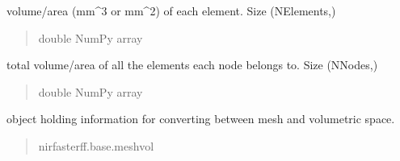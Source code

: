 \documentclass[letterpaper,10pt,english]{sphinxmanual}
\begin{document}
\begin{fulllineitems}
\begin{fulllineitems}
\begin{quote}
\begin{description}
\end{description}\end{quote}

\end{fulllineitems}


\begin{fulllineitems}
\label{\detokenize{_autosummary/nirfasterff.base.dcs_mesh.dcsmesh:nirfasterff.base.dcs_mesh.dcsmesh.element_area}}
\pysigstartsignatures
\pysigline
{}
\pysigstopsignatures
\sphinxAtStartPar
volume/area (mm\textasciicircum{}3 or mm\textasciicircum{}2) of each element. Size (NElements,)
\begin{quote}\begin{description}
\sphinxAtStartPar
double NumPy array

\end{description}\end{quote}

\end{fulllineitems}


\begin{fulllineitems}
\label{\detokenize{_autosummary/nirfasterff.base.dcs_mesh.dcsmesh:nirfasterff.base.dcs_mesh.dcsmesh.support}}
\pysigstartsignatures
\pysigline
{}
\pysigstopsignatures
\sphinxAtStartPar
total volume/area of all the elements each node belongs to. Size (NNodes,)
\begin{quote}\begin{description}
\sphinxAtStartPar
double NumPy array

\end{description}\end{quote}

\end{fulllineitems}


\begin{fulllineitems}
\label{\detokenize{_autosummary/nirfasterff.base.dcs_mesh.dcsmesh:nirfasterff.base.dcs_mesh.dcsmesh.vol}}
\pysigstartsignatures
\pysigline
{}
\pysigstopsignatures
\sphinxAtStartPar
object holding information for converting between mesh and volumetric space.
\begin{quote}\begin{description}
\sphinxAtStartPar
nirfasterff.base.meshvol


\end{description}
\end{quote}
\end{fulllineitems}
\end{fulllineitems}
\end{document}
